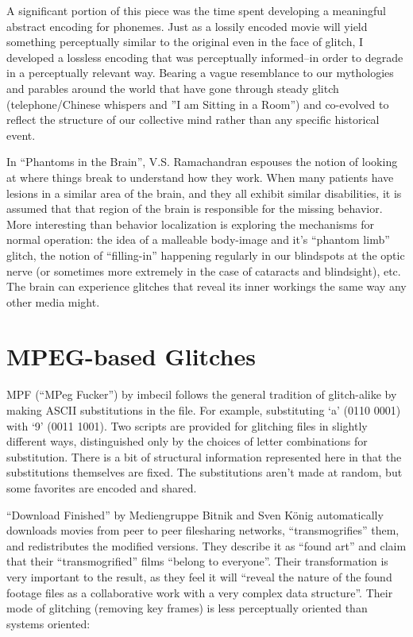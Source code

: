 \documentclass{thesis}
\begin{document}
	A significant portion of this piece was the time spent developing a meaningful abstract encoding for phonemes. Just as a lossily encoded movie will yield something perceptually similar to the original even in the face of glitch, I developed a lossless encoding that was perceptually informed--in order to degrade in a perceptually relevant way. Bearing a vague resemblance to our mythologies and parables around the world that have gone through steady glitch (telephone/Chinese whispers and ''I am Sitting in a Room'') and co-evolved to reflect the structure of our collective mind rather than any specific historical event.

	In ``Phantoms in the Brain''\cite{ramachandran_phantoms_1999}, V.S. Ramachandran espouses the notion of looking at where things break to understand how they work. When many patients have lesions in a similar area of the brain, and they all exhibit similar disabilities, it is assumed that that region of the brain is responsible for the missing behavior. More interesting than behavior localization is exploring the mechanisms for normal operation: the idea of a malleable body-image and it's ``phantom limb'' glitch, the notion of ``filling-in'' happening regularly in our blindspots at the optic nerve (or sometimes more extremely in the case of cataracts and blindsight), etc. The brain can experience glitches that reveal its inner workings the same way any other media might.
	
\section{MPEG-based Glitches}
	MPF (``MPeg Fucker'') by imbecil\cite{imbecil_mpeg_2004} follows the general tradition of glitch-alike by making ASCII substitutions in the file. For example, substituting `a' (0110 0001) with `9' (0011 1001). Two scripts are provided for glitching files in slightly different ways, distinguished only by the choices of letter combinations for substitution. There is a bit of structural information represented here in that the substitutions themselves are fixed. The substitutions aren't made at random, but some favorites are encoded and shared.
	
	``Download Finished'' by Mediengruppe Bitnik and Sven K\"onig\cite{!mediengruppe_bitnik_and_sven_knig_download_????} automatically downloads movies from peer to peer filesharing networks, ``transmogrifies'' them, and redistributes the modified versions. They describe it as ``found art'' and claim that their ``transmogrified'' films ``belong to everyone''. Their transformation is very important to the result, as they feel it will ``reveal the nature of the found footage files as a collaborative work with a very complex data structure''. Their mode of glitching (removing key frames) is less perceptually oriented than systems oriented:
	
\end{document}
